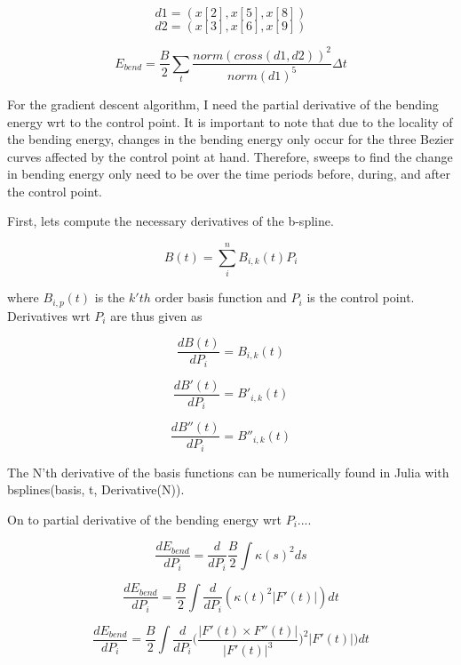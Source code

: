 \documentclass{article}
\begin{document}
$$d1 = (x[2],x[5],x[8])$$
$$d2 = (x[3],x[6],x[9])$$

\begin{equation}
    E_{bend} = \frac{B}{2} \sum_t \frac{norm(cross(d1,d2))^2}{norm(d1)^5} \Delta t
\end{equation}

For the gradient descent algorithm, I need the partial derivative of the bending energy wrt to the control point. It is important to note that due to the locality of the bending energy, changes in the bending energy only occur for the three Bezier curves affected by the control point at hand. Therefore, sweeps to find the change in bending energy only need to be over the time periods before, during, and after the control point. 

First, lets compute the necessary derivatives of the b-spline.

\begin{equation}
    B(t) = \sum_i^n B_{i,k}(t)P_i
\end{equation}

\noindent
where $B_{i,p}(t)$ is the $k'th$ order basis function and $P_i$ is the control point. Derivatives wrt $P_i$ are thus given as

\begin{equation}
    \frac{dB(t)}{dP_i} = B_{i,k}(t)
\end{equation}

\begin{equation}
    \frac{dB'(t)}{dP_i} = B'_{i,k}(t)
\end{equation}

\begin{equation}
    \frac{dB''(t)}{dP_i} = B''_{i,k}(t)
\end{equation}

\noindent
The N'th derivative of the basis functions can be numerically found in Julia with bsplines(basis, t, Derivative(N)).

On to partial derivative of the bending energy wrt $P_i$....

\begin{equation}
    \frac{dE_{bend}}{dP_i} = \frac{d}{dP_i} \frac{B}{2} \int \kappa(s)^2 ds
\end{equation}

\begin{equation}
    \frac{dE_{bend}}{dP_i} =  \frac{B}{2} \int \frac{d}{dP_i} (\kappa(t)^2 |F'(t)|) dt
\end{equation}

\begin{equation}
    \frac{dE_{bend}}{dP_i} =  \frac{B}{2} \int \frac{d}{dP_i} \bigg(\frac{|F'(t) \times F''(t)|}{|F'(t)|^3}\bigg)^2 |F'(t)|) dt
\end{equation}
\end{document}
